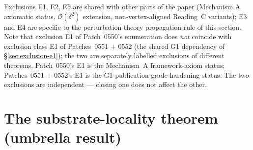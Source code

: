 \documentclass[11pt,letterpaper]{article}
\newcommand{\bigO}[1]{\mathcal{O}(#1)}
\begin{document}
Exclusions E1, E2, E5 are shared with other parts of the paper (Mechanism A axiomatic status, $\bigO{\delta^2}$ extension, non-vertex-aligned Reading~C variants); E3 and E4 are specific to the perturbation-theory propagation rule of this section. Note that exclusion E1 of Patch~0550's enumeration does \emph{not} coincide with exclusion class E1 of Patches~0551 + 0552 (the shared G1 dependency of \S\ref{sec:exclusion-e1}); the two are separately labelled exclusions of different theorems. Patch~0550's E1 is the Mechanism~A framework-axiom status; Patches~0551 + 0552's E1 is the G1 publication-grade hardening status. The two exclusions are independent — closing one does not affect the other.

\section{The substrate-locality theorem (umbrella result)}
\label{sec:substrate-locality-theorem}

\end{document}

